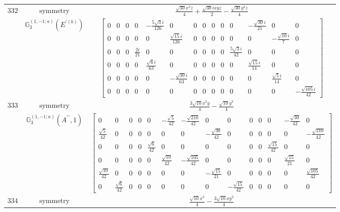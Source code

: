 \documentclass[fleqn,8pt,landscape]{jsarticle}
\begin{document}
\begin{longtable}{ccc}
$ 332 $ & $ \text{symmetry} $ & $ \frac{\sqrt{30} x^{2} z}{4} + \frac{\sqrt{30} i x y z}{2} - \frac{\sqrt{30} y^{2} z}{4} $ \\
$  $ & $ \mathbb{G}_{3}^{(1,-1;a)}(E^{\prime(b)}) $ & $ \begin{bmatrix} 0 & 0 & 0 & 0 & - \frac{5 \sqrt{3} i}{126} & 0 & 0 & 0 & 0 & 0 & 0 & - \frac{\sqrt{30} i}{21} & 0 & 0 \\ 0 & 0 & 0 & 0 & 0 & \frac{\sqrt{15} i}{126} & 0 & 0 & 0 & 0 & 0 & 0 & - \frac{\sqrt{10} i}{7} & 0 \\ 0 & 0 & 0 & \frac{2 i}{21} & 0 & 0 & 0 & 0 & 0 & 0 & \frac{5 \sqrt{3} i}{42} & 0 & 0 & 0 \\ 0 & 0 & 0 & 0 & \frac{\sqrt{6} i}{63} & 0 & 0 & 0 & 0 & 0 & 0 & \frac{\sqrt{15} i}{14} & 0 & 0 \\ 0 & 0 & 0 & 0 & 0 & - \frac{\sqrt{30} i}{63} & 0 & 0 & 0 & 0 & 0 & 0 & \frac{\sqrt{5} i}{14} & 0 \\ 0 & 0 & 0 & 0 & 0 & 0 & 0 & 0 & 0 & 0 & 0 & 0 & 0 & - \frac{\sqrt{105} i}{42} \end{bmatrix} $ \\ \hline
$ 333 $ & $ \text{symmetry} $ & $ \frac{3 \sqrt{10} x^{2} y}{4} - \frac{\sqrt{10} y^{3}}{4} $ \\
$  $ & $ \mathbb{G}_{3}^{(1,-1;a)}(A^{\prime\prime},1) $ & $ \begin{bmatrix} 0 & 0 & 0 & 0 & 0 & - \frac{\sqrt{5}}{42} & - \frac{\sqrt{210}}{42} & 0 & 0 & 0 & 0 & 0 & - \frac{\sqrt{30}}{42} & 0 \\ \frac{\sqrt{5}}{42} & 0 & 0 & 0 & 0 & 0 & 0 & - \frac{\sqrt{30}}{42} & 0 & 0 & 0 & 0 & 0 & - \frac{\sqrt{210}}{42} \\ 0 & 0 & 0 & 0 & \frac{\sqrt{6}}{42} & 0 & 0 & 0 & 0 & 0 & 0 & \frac{\sqrt{15}}{42} & 0 & 0 \\ 0 & 0 & 0 & 0 & 0 & \frac{\sqrt{10}}{42} & - \frac{\sqrt{105}}{42} & 0 & 0 & 0 & 0 & 0 & \frac{\sqrt{15}}{21} & 0 \\ \frac{\sqrt{10}}{42} & 0 & 0 & 0 & 0 & 0 & 0 & - \frac{\sqrt{15}}{21} & 0 & 0 & 0 & 0 & 0 & \frac{\sqrt{105}}{42} \\ 0 & \frac{\sqrt{6}}{42} & 0 & 0 & 0 & 0 & 0 & 0 & - \frac{\sqrt{15}}{42} & 0 & 0 & 0 & 0 & 0 \end{bmatrix} $ \\ \hline
$ 334 $ & $ \text{symmetry} $ & $ \frac{\sqrt{10} x^{3}}{4} - \frac{3 \sqrt{10} x y^{2}}{4} $ \\

\end{longtable}
\end{document}
